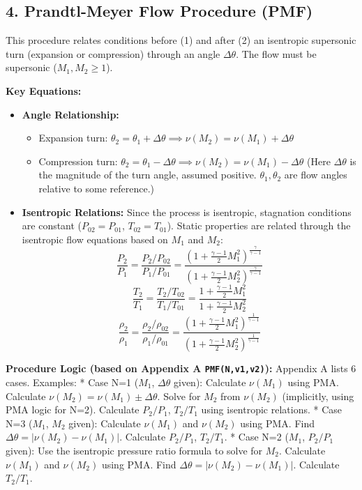 \hypertarget{prandtl-meyer-flow-procedure-pmf}{%
\subsection{4. Prandtl-Meyer Flow Procedure
(PMF)}\label{prandtl-meyer-flow-procedure-pmf}}

This procedure relates conditions before (1) and after (2) an isentropic
supersonic turn (expansion or compression) through an angle
\(\Delta\theta\). The flow must be supersonic (\(M_1, M_2 \ge 1\)).

\textbf{Key Equations:}

\begin{itemize}
\tightlist
\item
  \textbf{Angle Relationship:}

  \begin{itemize}
  \tightlist
  \item
    Expansion turn:
    \(\theta_2 = \theta_1 + \Delta\theta \implies \nu(M_2) = \nu(M_1) + \Delta\theta\)
  \item
    Compression turn:
    \(\theta_2 = \theta_1 - \Delta\theta \implies \nu(M_2) = \nu(M_1) - \Delta\theta\)
    (Here \(\Delta\theta\) is the magnitude of the turn angle, assumed
    positive. \(\theta_1, \theta_2\) are flow angles relative to some
    reference.)
  \end{itemize}
\item
  \textbf{Isentropic Relations:} Since the process is isentropic,
  stagnation conditions are constant (\(P_{02}=P_{01}\),
  \(T_{02}=T_{01}\)). Static properties are related through the
  isentropic flow equations based on \(M_1\) and \(M_2\):
  \[ \frac{P_2}{P_1} = \frac{P_2/P_{02}}{P_1/P_{01}} = \frac{(1 + \frac{\gamma-1}{2}M_1^2)^{\frac{\gamma}{\gamma-1}}}{(1 + \frac{\gamma-1}{2}M_2^2)^{\frac{\gamma}{\gamma-1}}} \]
  \[ \frac{T_2}{T_1} = \frac{T_2/T_{02}}{T_1/T_{01}} = \frac{1 + \frac{\gamma-1}{2}M_1^2}{1 + \frac{\gamma-1}{2}M_2^2} \]
  \[ \frac{\rho_2}{\rho_1} = \frac{\rho_2/\rho_{02}}{\rho_1/\rho_{01}} = \frac{(1 + \frac{\gamma-1}{2}M_1^2)^{\frac{1}{\gamma-1}}}{(1 + \frac{\gamma-1}{2}M_2^2)^{\frac{1}{\gamma-1}}} \]
\end{itemize}

\textbf{Procedure Logic (based on Appendix A \texttt{PMF(N,v1,v2)}):}
Appendix A lists 6 cases. Examples: * Case N=1 (\(M_1\),
\(\Delta\theta\) given): Calculate \(\nu(M_1)\) using PMA. Calculate
\(\nu(M_2) = \nu(M_1) \pm \Delta\theta\). Solve for \(M_2\) from
\(\nu(M_2)\) (implicitly, using PMA logic for N=2). Calculate
\(P_2/P_1\), \(T_2/T_1\) using isentropic relations. * Case N=3
(\(M_1\), \(M_2\) given): Calculate \(\nu(M_1)\) and \(\nu(M_2)\) using
PMA. Find \(\Delta\theta = |\nu(M_2) - \nu(M_1)|\). Calculate
\(P_2/P_1\), \(T_2/T_1\). * Case N=2 (\(M_1\), \(P_2/P_1\) given): Use
the isentropic pressure ratio formula to solve for \(M_2\). Calculate
\(\nu(M_1)\) and \(\nu(M_2)\) using PMA. Find
\(\Delta\theta = |\nu(M_2) - \nu(M_1)|\). Calculate \(T_2/T_1\).

